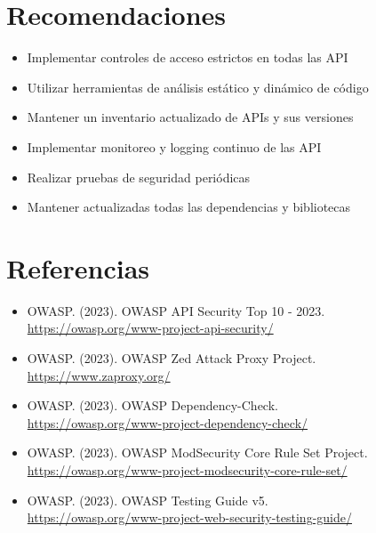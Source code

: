 \documentclass[a4paper,12pt]{article}
\begin{document}
\section{Recomendaciones}

\begin{itemize}
    \item Implementar controles de acceso estrictos en todas las API
    \item Utilizar herramientas de análisis estático y dinámico de código
    \item Mantener un inventario actualizado de APIs y sus versiones
    \item Implementar monitoreo y logging continuo de las API
    \item Realizar pruebas de seguridad periódicas
    \item Mantener actualizadas todas las dependencias y bibliotecas
\end{itemize}

\section{Referencias}

\begin{itemize}
    \item OWASP. (2023). OWASP API Security Top 10 - 2023. \\ \url{https://owasp.org/www-project-api-security/}
    \item OWASP. (2023). OWASP Zed Attack Proxy Project. \\ \url{https://www.zaproxy.org/}
    \item OWASP. (2023). OWASP Dependency-Check. \\ \url{https://owasp.org/www-project-dependency-check/}
    \item OWASP. (2023). OWASP ModSecurity Core Rule Set Project. \\ \url{https://owasp.org/www-project-modsecurity-core-rule-set/}
    \item OWASP. (2023). OWASP Testing Guide v5. \\ \url{https://owasp.org/www-project-web-security-testing-guide/}
\end{itemize}
\end{document}
